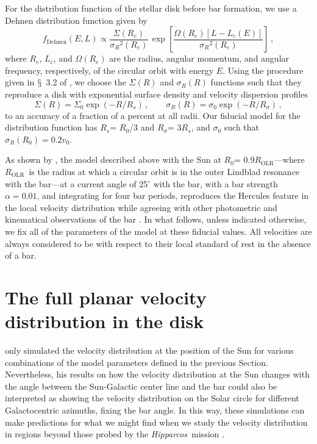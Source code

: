 \documentclass[12pt,preprint]{aastex}
\newcommand{\eg}{e.g.}
\newcommand{\sectionname}{$\mathsection$}
\newcommand{\hipparcos}{\emph{Hipparcos}}
\newcommand{\vo}{\ensuremath{v_0}}
\newcommand{\Ro}{\ensuremath{R_0}}
\newcommand{\fdehnen}{\ensuremath{f_{\text{Dehnen}}}}
\newcommand{\sigmaR}{\ensuremath{\sigma_R}}
\newcommand{\rE}{\ensuremath{R_e}}
\newcommand{\Lc}{\ensuremath{L_c}}
\newcommand{\Rs}{\ensuremath{R_s}}
\newcommand{\Rsigma}{\ensuremath{R_{\sigma}}}
\newcommand{\Rolr}{\ensuremath{R_{\text{OLR}}}}
\begin{document}
For the distribution function of the stellar disk before bar
formation, we use a Dehnen distribution function \citep{dehnen99b}
given by
\begin{equation}\label{eq:fdehnen}
\fdehnen(E,L) \propto \frac{\Sigma(\rE)}{\sigmaR^2(\rE)} \, \exp\left[ \frac{\Omega(\rE)\left[L-\Lc(E)\right]}{\sigmaR^2(\rE)}\right]\,,
\end{equation}
where \rE, \Lc, and $\Omega(\rE)$ are the radius, angular momentum,
and angular frequency, respectively, of the circular orbit with energy
$E$. Using the procedure given in \sectionname~3.2 of
\citet{dehnen99b}, we choose the $\Sigma(R)$ and $\sigmaR(R)$
functions such that they reproduce a disk with exponential surface
density and velocity dispersion profiles
\begin{equation}
\Sigma(R) = \Sigma_0 \exp\left(-R/\Rs\right)\,, \qquad 
\sigmaR(R) = \sigma_0 \exp\left(-R/\Rsigma\right)\,,
\end{equation}
to an accuracy of a fraction of a percent at all radii. Our fiducial
model for the distribution function has \Rs = \Ro /3 and \Rsigma =
3\Rs, and $\sigma_0$ such that $\sigmaR(\Ro) = 0.2 \vo$.

As shown by \citet{dehnen99c,dehnen00a}, the model described above
with the Sun at \Ro = 0.9\Rolr---where \Rolr\ is the radius at which a
circular orbit is in the outer Lindblad resonance with the bar---at a
current angle of 25$^{\circ}$ with the bar, with a bar strength
$\alpha = 0.01$, and integrating for four bar periods, reproduces the
Hercules feature in the local velocity distribution while agreeing
with other photometric and kinematical observations of the bar
\citep[\eg,][]{binney97a,bissantz02a,cole02a,Shen10a}. In what
follows, unless indicated otherwise, we fix all of the parameters of
the model at these fiducial values. All velocities are always
considered to be with respect to their local standard of rest in the
absence of a bar.

\section{The full planar velocity distribution in the disk}\label{sec:2d}

\citet{dehnen00a} only simulated the velocity distribution at the
position of the Sun for various combinations of the model parameters
defined in the previous Section. Nevertheless, his results on how the
velocity distribution at the Sun changes with the angle between the
Sun-Galactic center line and the bar could also be interpreted as
showing the velocity distribution on the Solar circle for different
Galactocentric azimuths, fixing the bar angle. In this way, these
simulations can make predictions for what we might find when we study
the velocity distribution in regions beyond those probed by the
\hipparcos\ mission \citep{ESA97a}.
\end{document}

